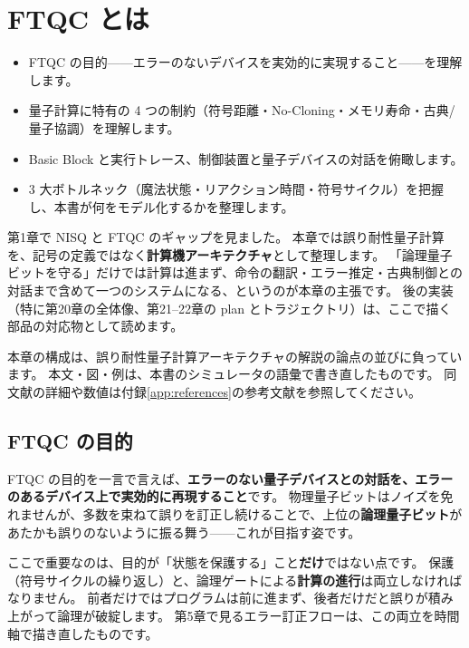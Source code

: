 \chapter{FTQC とは}\label{ch:ftqc}

\begin{chaptergoal}
  \begin{itemize}
  \item FTQC の目的——エラーのないデバイスを実効的に実現すること——を理解します。
  \item 量子計算に特有の 4 つの制約（符号距離・No-Cloning・メモリ寿命・古典/量子協調）を理解します。
  \item Basic Block と実行トレース、制御装置と量子デバイスの対話を俯瞰します。
  \item 3 大ボトルネック（魔法状態・リアクション時間・符号サイクル）を把握し、本書が何をモデル化するかを整理します。
  \end{itemize}
\end{chaptergoal}

第1章で NISQ と FTQC のギャップを見ました。
本章では誤り耐性量子計算を、記号の定義ではなく\textbf{計算機アーキテクチャ}として整理します。
「論理量子ビットを守る」だけでは計算は進まず、命令の翻訳・エラー推定・古典制御との対話まで含めて一つのシステムになる、というのが本章の主張です。
後の実装（特に第20章の全体像、第21--22章の plan とトラジェクトリ）は、ここで描く部品の対応物として読めます。

\begin{warningbox}
  本章の構成は、誤り耐性量子計算アーキテクチャの解説\cite{suzuki2026ftqc}の論点の並びに負っています。
  本文・図・例は、本書のシミュレータの語彙で書き直したものです。
  同文献の詳細や数値は付録\ref{app:references}の参考文献を参照してください。
\end{warningbox}

\section{FTQC の目的}\label{sec:purpose}

FTQC の目的を一言で言えば、\textbf{エラーのない量子デバイスとの対話を、エラーのあるデバイス上で実効的に再現すること}です。
物理量子ビットはノイズを免れませんが、多数を束ねて誤りを訂正し続けることで、上位の\textbf{論理量子ビット}があたかも誤りのないように振る舞う——これが目指す姿です。

ここで重要なのは、目的が「状態を保護する」こと\textbf{だけ}ではない点です。
保護（符号サイクルの繰り返し）と、論理ゲートによる\textbf{計算の進行}は両立しなければなりません。
前者だけではプログラムは前に進まず、後者だけだと誤りが積み上がって論理が破綻します。
第5章で見るエラー訂正フローは、この両立を時間軸で描き直したものです。

